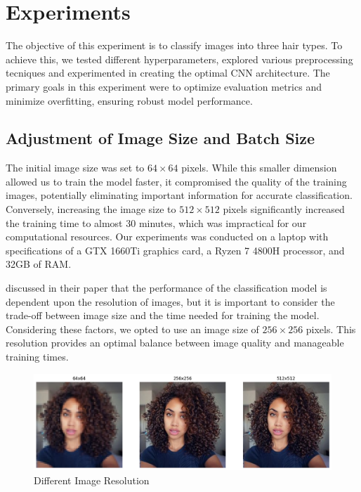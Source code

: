 \section{Experiments}

The objective of this experiment is to classify images into three hair types. To achieve this, we tested different hyperparameters, explored various preprocessing tecniques and experimented in creating the optimal CNN architecture. The primary goals in this experiment were to optimize evaluation metrics and minimize overfitting, ensuring robust model performance.

\subsection{Adjustment of Image Size and Batch Size}

The initial image size was set to $64 \times 64$ pixels. While this smaller dimension allowed us to train the model faster, it compromised the quality of the training images, potentially eliminating important information for accurate classification. Conversely, increasing the image size to $512 \times 512$ pixels significantly increased the training time to almost 30 minutes, which was impractical for our computational resources. Our experiments was conducted on a laptop with specifications of a GTX 1660Ti graphics card, a Ryzen 7 4800H processor, and 32GB of RAM.

\cite{impact_image_resolution} discussed in their paper that the performance of the classification model is dependent upon the resolution of images, but it is important to consider the trade-off between image size and the time needed for training the model. Considering these factors, we opted to use an image size of $256 \times 256$ pixels. This resolution provides an optimal balance between image quality and manageable training times. 

\begin{figure}[H]
    \includegraphics[width=\linewidth]{figures/image_sizes.png}
    \caption{Different Image Resolution}
    \label{fig:image_sizes}
  \end{figure}

